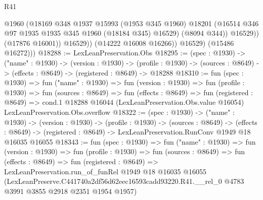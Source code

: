 \begin{lexlean}{R41}
\begin{coremodule}
                      @1960
                      (@18169
                        @348
                        @1937
                        @15993
                        (@1953 @345 @1960)
                        @18201
                        (@16514 @346 @97 @1935 @1935 @345 @1960 (@18184 @345) @16529)
                        (@8094 @344))
                      @16529))
                  (@17876 @16001))
                @16529))
            (@14222 @16008 @16266))
          @16529)
        (@15486 @16272)))
@18288 := LexLeanPreservation.Obs
@18295 := (spec : @1930) ->
  ("name" : @1930) ->
  (version : @1930) ->
  (profile : @1930) -> (sources : @8649) -> (effects : @8649) -> (registered : @8649) -> @18288
@18310 := fun (spec : @1930) =>
  fun ("name" : @1930) =>
  fun (version : @1930) =>
  fun (profile : @1930) =>
  fun (sources : @8649) =>
  fun (effects : @8649) =>
  fun (registered : @8649) =>
  cond.{1} @18288 @16044 (LexLeanPreservation.Obs.value @16054) LexLeanPreservation.Obs.overflow
@18322 := (spec : @1930) ->
  ("name" : @1930) ->
  (version : @1930) ->
  (profile : @1930) ->
  (sources : @8649) ->
  (effects : @8649) -> (registered : @8649) -> LexLeanPreservation.RunConv @1949 @18 @16035 @16055
@18343 := fun (spec : @1930) =>
  fun ("name" : @1930) =>
  fun (version : @1930) =>
  fun (profile : @1930) =>
  fun (sources : @8649) =>
  fun (effects : @8649) =>
  fun (registered : @8649) =>
  LexLeanPreservation.run_of_funRel
    @1949
    @18
    @16035
    @16055
    (LexLeanPreserve.C441740a2df56d62eec16593cadd93220.R41.__rel_0
      @4783
      @3991
      @3855
      @2918
      @2351
      @1954
      @1957)
\end{coremodule}
\end{lexlean}
